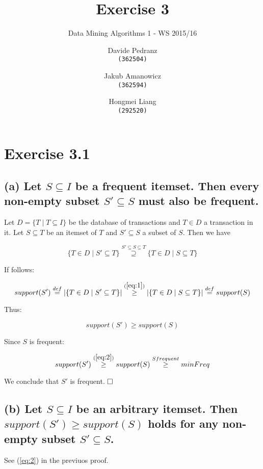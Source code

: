 \documentclass{scrartcl}
\title{Exercise 3}
\subtitle{Data Mining Algorithms 1 - WS 2015/16}
\author{
  Davide Pedranz\\ \texttt{(362504)}
  \and
  Jakub Amanowicz \\ \texttt{(362594)}
  \and
  Hongmei Liang\\  \texttt{(292520)}
}
\newcommand{\qed}{$\hfill\square$}
\begin{document}
\maketitle

\section*{Exercise 3.1}

\subsection*{(a) Let $S \subseteq I$ be a frequent itemset. Then every non-empty subset $S' \subseteq S$ must also be
frequent.}

Let $D = \{T \mid T \subseteq I\}$ be the database of transactions and $T \in D$ a transaction in it.
Let $S \subseteq T$ be an itemset of $T$  and $S' \subseteq S$ a subset of $S$. Then we have

\begin{equation} \label{eq:1}
\{ T \in D \mid S' \subseteq T \} \overset{S' \subseteq S \subseteq T}{\supseteq}  \{ T \in D \mid S \subseteq T \}
\end{equation}

If follows:

\begin{equation*}
support(S') \overset{def}{=} |\{ T \in D \mid S' \subseteq T \}| \overset{(\ref{eq:1})}{\geq} |\{ T \in D \mid S \subseteq T \}| \overset{def}{=} support(S)
\end{equation*}

Thus:

\begin{equation} \label{eq:2}
support(S') \geq support(S)
\end{equation}

Since $S$ is frequent:

\begin{equation*}
support(S') \overset{(\ref{eq:2})}{\geq} support(S) \overset{S frequent}{\geq} minFreq
\end{equation*}

We conclude that $S'$ is frequent. \qed

\subsection*{(b) Let $S \subseteq I$ be an arbitrary itemset. Then $support(S') \geq support(S)$ holds for any non-empty subset $S' \subseteq S$.}

See (\ref{eq:2}) in the previuos proof.
\end{document}
